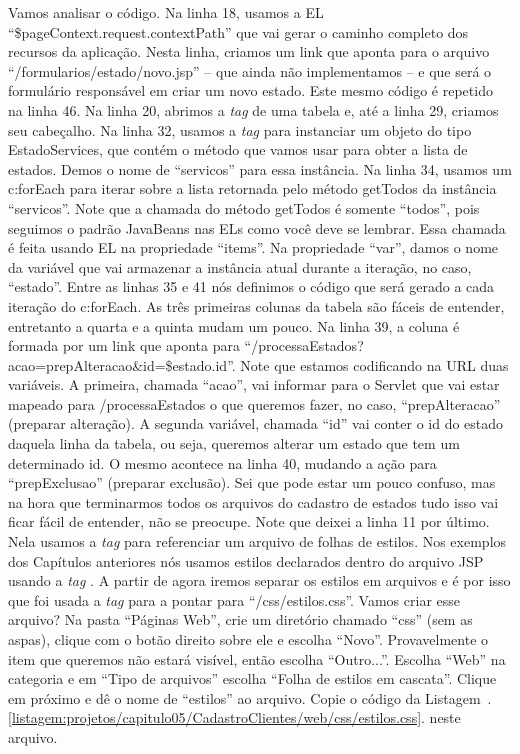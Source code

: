 Vamos analisar o código. Na linha 18, usamos a EL ``\${pageContext.request.contextPath}'' que vai gerar o caminho completo dos recursos da aplicação. Nesta linha, criamos um link que aponta para o arquivo ``/formularios/estado/novo.jsp'' – que ainda não implementamos – e que será o formulário responsável em criar um novo estado. Este mesmo código é repetido na linha 46. Na linha 20, abrimos a \textit{tag} de uma tabela e, até a linha 29, criamos seu cabeçalho. Na linha 32, usamos a \textit{tag}  para instanciar um objeto do tipo EstadoServices, que contém o método que vamos usar para obter a lista de estados. Demos o nome de ``servicos'' para essa instância. Na linha 34, usamos um c:forEach para iterar sobre a lista retornada pelo método getTodos da instância ``servicos''. Note que a chamada do método getTodos é somente ``todos'', pois seguimos o padrão JavaBeans nas ELs como você deve se lembrar. Essa chamada é feita usando EL na propriedade ``items''. Na propriedade ``var'', damos o nome da variável que vai armazenar a instância atual durante a iteração, no caso, ``estado''. Entre as linhas 35 e 41 nós definimos o código que será gerado a cada iteração do c:forEach. As três primeiras colunas da tabela são fáceis de entender, entretanto a quarta e a quinta mudam um pouco. Na linha 39, a coluna é formada por um link que aponta para ``/processaEstados?acao=prepAlteracao\&id=\${estado.id}''. Note que estamos codificando na URL duas variáveis. A primeira, chamada ``acao'', vai informar para o Servlet que vai estar mapeado para /processaEstados o que queremos fazer, no caso, ``prepAlteracao'' (preparar alteração). A segunda variável, chamada ``id'' vai conter o id do estado daquela linha da tabela, ou seja, queremos alterar um estado que tem um determinado id. O mesmo acontece na linha 40, mudando a ação para ``prepExclusao'' (preparar exclusão). Sei que pode estar um pouco confuso, mas na hora que terminarmos todos os arquivos do cadastro de estados tudo isso vai ficar fácil de entender, não se preocupe.
Note que deixei a linha 11 por último. Nela usamos a \textit{tag}  para referenciar um arquivo de folhas de estilos. Nos exemplos dos Capítulos anteriores nós usamos estilos declarados dentro do arquivo JSP usando a \textit{tag} . A partir de agora iremos separar os estilos em arquivos e é por isso que foi usada a \textit{tag}  para a pontar para ``/css/estilos.css''. Vamos criar esse arquivo? Na pasta ``Páginas Web'', crie um diretório chamado ``css'' (sem as aspas), clique com o botão direito sobre ele e escolha ``Novo''. Provavelmente o item que queremos não estará visível, então escolha ``Outro...''. Escolha ``Web'' na categoria e em ``Tipo de arquivos'' escolha ``Folha de estilos em cascata''. Clique em próximo e dê o nome de ``estilos'' ao arquivo. Copie o código da Listagem~\thechapter.\ref{listagem:projetos/capitulo05/CadastroClientes/web/css/estilos.css}. neste arquivo.

